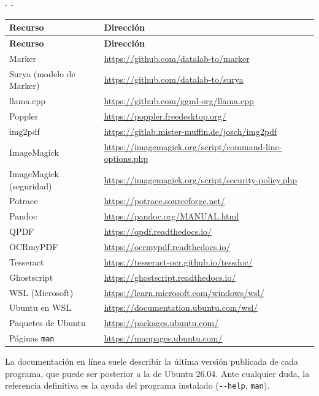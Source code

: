 \documentclass[11pt,a4paper]{article}
\makeatletter
\newcommand{\necesitaespacio}[1]{\par\penalty-100\begingroup
	\setlength{\dimen@}{#1}\dimen@ii\pagegoal\advance\dimen@ii-\pagetotal
	\ifdim\dimen@>\dimen@ii\ifdim\dimen@ii>\z@\vfil\fi\penalty-\@M\fi\endgroup}
\newcommand{\cmd}[1]{\texttt{\textcolor{colcmd}{#1}}}      %
\newcommand{\opt}[1]{\texttt{\textcolor{colopt}{#1}}}      %
\newcommand{\cab}[1]{\textbf{#1}}
\makeatother
\begin{document}
	\begingroup\small
	\necesitaespacio{30\baselineskip}
	\begin{longtable}{L{3.2cm}L{11.86cm}}
		\toprule{}\cab{Recurso} & \cab{Dirección}\\\midrule
		\endfirsthead
		\toprule{}\cab{Recurso} & \cab{Dirección}\\\midrule
		\endhead
		\bottomrule
		\endfoot
		Marker & \url{https://github.com/datalab-to/marker}\\*
		Surya (modelo de Marker) & \url{https://github.com/datalab-to/surya}\\
		llama.cpp & \url{https://github.com/ggml-org/llama.cpp}\\
		Poppler & \url{https://poppler.freedesktop.org/}\\
		img2pdf & \url{https://gitlab.mister-muffin.de/josch/img2pdf}\\
		ImageMagick & \url{https://imagemagick.org/script/command-line-options.php}\\
		ImageMagick (seguridad) & \url{https://imagemagick.org/script/security-policy.php}\\
		Potrace & \url{https://potrace.sourceforge.net/}\\
		Pandoc & \url{https://pandoc.org/MANUAL.html}\\
		QPDF & \url{https://qpdf.readthedocs.io/}\\
		OCRmyPDF & \url{https://ocrmypdf.readthedocs.io/}\\
		Tesseract & \url{https://tesseract-ocr.github.io/tessdoc/}\\
		Ghostscript & \url{https://ghostscript.readthedocs.io/}\\
		WSL (Microsoft) & \url{https://learn.microsoft.com/windows/wsl/}\\
		Ubuntu en WSL & \url{https://documentation.ubuntu.com/wsl/}\\
		Paquetes de Ubuntu & \url{https://packages.ubuntu.com/}\\*
		Páginas \texttt{man} & \url{https://manpages.ubuntu.com/}\\
	\end{longtable}
	\endgroup
	
	\begin{nota}
		La documentación en línea suele describir la última versión publicada de cada programa, que puede ser posterior a la de Ubuntu 26.04. Ante cualquier duda, la referencia definitiva es la ayuda del programa instalado (\opt{-{}-help}, \cmd{man}).
	\end{nota}
	
\end{document}

